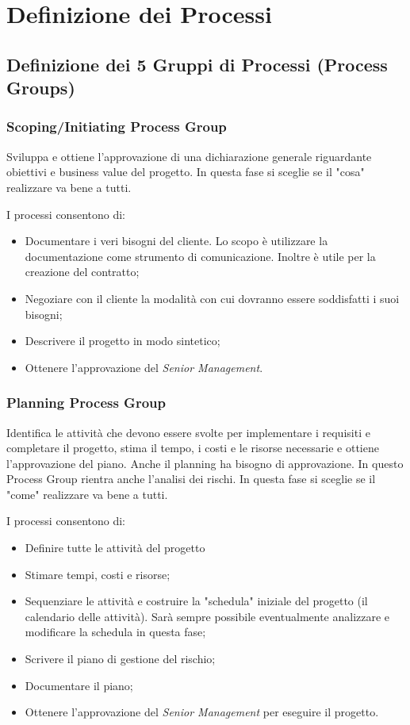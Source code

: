 \section{Definizione dei Processi}
\subsection{Definizione dei 5 Gruppi di Processi (Process Groups)}
\subsubsection{Scoping/Initiating Process Group}
\begin{info}
	Sviluppa e ottiene l'approvazione di una dichiarazione generale riguardante obiettivi e business value del progetto. In questa fase si sceglie se il "cosa" realizzare va bene a tutti.
\end{info}
I processi consentono di:
\begin{itemize}
	\item Documentare i veri bisogni del cliente. Lo scopo è utilizzare la documentazione come strumento di comunicazione. Inoltre è utile per la creazione del contratto;
	\item Negoziare con il cliente la modalità con cui dovranno essere soddisfatti i suoi bisogni;
	\item Descrivere il progetto in modo sintetico;
	\item Ottenere l'approvazione del \textit{Senior Management}.
\end{itemize}
\subsubsection{Planning Process Group}
\begin{info}
	Identifica le attività che devono essere svolte per implementare i requisiti e completare il progetto, stima il tempo, i costi e le risorse necessarie e ottiene l'approvazione del piano. Anche il planning ha bisogno di approvazione. In questo Process Group rientra anche l'analisi dei rischi. In questa fase si sceglie se il "come" realizzare va bene a tutti.
\end{info}
I processi consentono di:
\begin{itemize}
	\item Definire tutte le attività del progetto
	\item Stimare tempi, costi e risorse;
	\item Sequenziare le attività e costruire la "schedula" iniziale del progetto (il calendario delle attività). Sarà sempre possibile eventualmente analizzare e modificare la schedula in questa fase;
	\item Scrivere il piano di gestione del rischio;
	\item Documentare il piano;
	\item Ottenere l'approvazione del \textit{Senior Management} per eseguire il progetto.
\end{itemize}
